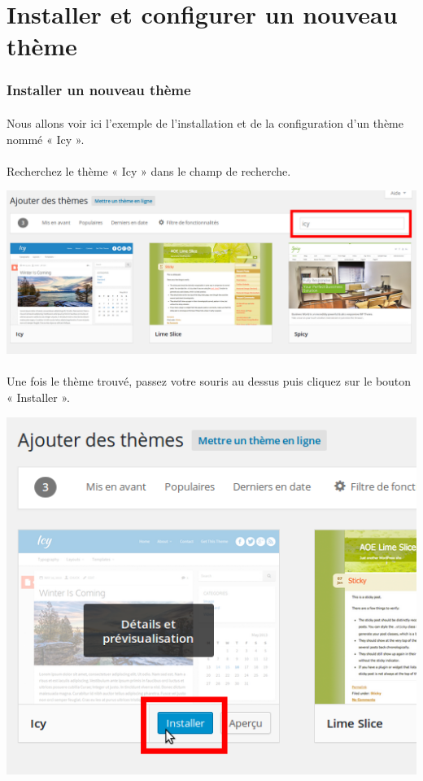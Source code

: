 \documentclass[10pt,a4paper]{article}
\begin{document}
\section{Installer et configurer un nouveau thème}
\subsubsection{Installer un nouveau thème}
\paragraph{}Nous allons voir ici l'exemple de l'installation et de la configuration d'un thème nommé « Icy ».
\paragraph{}Recherchez le thème « Icy » dans le champ de recherche.
\begin{center}
\includegraphics[scale=0.3]{img/0243.png}
\end{center}
\paragraph{}Une fois le thème trouvé, passez votre souris au dessus puis cliquez sur le bouton « Installer ».
\begin{center}
\includegraphics[scale=0.3]{img/0244.png}
\end{center}
\end{document}
